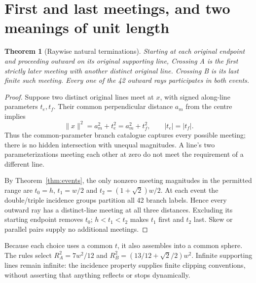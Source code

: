 \documentclass[11pt,a4paper]{article}
\newtheorem{theorem}{Theorem}[section]
\begin{document}
\section{First and last meetings, and two meanings of unit length}\label{sec:termination}
\begin{theorem}[Raywise natural terminations]\label{thm:termination}
Starting at each original endpoint and proceeding outward on its original supporting line, Crossing A is the first strictly later meeting with another distinct original line. Crossing B is its last finite such meeting. Every one of the 42 outward rays participates in both events.
\end{theorem}
\begin{proof}
Suppose two distinct original lines meet at $x$, with signed along-line parameters $t_e,t_f$. Their common perpendicular distance $a_m$ from the centre implies
\begin{equation}\label{eq:meetingnorm}
\|x\|^2=a_m^2+t_e^2=a_m^2+t_f^2,
\qquad |t_e|=|t_f|.
\end{equation}
Thus the common-parameter branch catalogue captures every possible meeting; there is no hidden intersection with unequal magnitudes. A line's two parameterizations meeting each other at zero do not meet the requirement of a different line.

By Theorem~\ref{thm:events}, the only nonzero meeting magnitudes in the permitted range are $t_0=h$, $t_1=w/2$ and $t_2=(1+\sqrt2)w/2$. At each event the double/triple incidence groups partition all 42 branch labels. Hence every outward ray has a distinct-line meeting at all three distances. Excluding its starting endpoint removes $t_0$; $h<t_1<t_2$ makes $t_1$ first and $t_2$ last. Skew or parallel pairs supply no additional meetings.
\end{proof}
Because each choice uses a common $t$, it also assembles into a common sphere. The rules select $R_A^2=7w^2/12$ and $R_B^2=(13/12+\sqrt2/2)w^2$. Infinite supporting lines remain infinite: the incidence property supplies finite clipping conventions, without asserting that anything reflects or stops dynamically.
\end{document}
